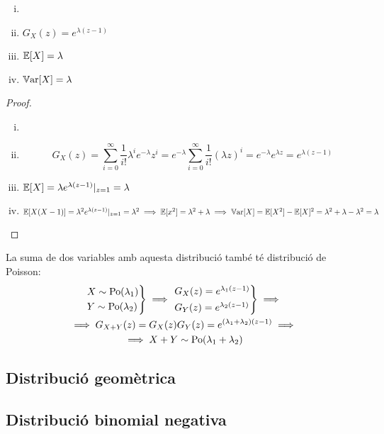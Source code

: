 \begin{prop}
    \begin{enumerate}[i)]
        \item[]
        \item $G_X(z) = e^{\lambda(z-1)}$
        \item $\operatorname{\mathbb{E}}[X] = \lambda$
        \item $\operatorname{\mathbb{V}ar}[X] = \lambda$
    \end{enumerate}
\end{prop}

\begin{proof}
    \begin{enumerate}[i)]
        \item[]
        \item \[G_X(z) = \sum_{i=0}^\infty \frac{1}{i!}\lambda^i e^{-\lambda} z^i =
            e^{-\lambda} \sum_{i=0}^\infty \frac{1}{i!}(\lambda z)^i = e^{-\lambda}e^{\lambda z} = e^{\lambda(z-1)}\]
        \item $\operatorname{\mathbb{E}}[X] = \lambda e^{\lambda(z-1)}|_{z=1} = \lambda$
        \item $\operatorname{\mathbb{E}}[X(X-1)] = \lambda^2 e^{\lambda(z-1)}|_{z=1} = \lambda^2 \implies \operatorname{\mathbb{E}}[x^2] = \lambda^2+\lambda \implies
         \operatorname{\mathbb{V}ar}[X] = \operatorname{\mathbb{E}}[X^2] - \operatorname{\mathbb{E}}[X]^2 = \lambda^2 + \lambda - \lambda^2 = \lambda$
    \end{enumerate}
\end{proof}

\begin{obs} La suma de dos variables amb aquesta distribució també té distribució de Poisson:
    \begin{gather*}
    \begin{rcases*} X \sim \operatorname{Po}(\lambda_1) \\ Y \sim \operatorname{Po}(\lambda_2) \end{rcases*} \implies
    \begin{rcases*} G_X(z) = e^{\lambda_1(z-1)} \\ G_Y(z) = e^{\lambda_2(z-1)} \end{rcases*}
    \implies \\
    \implies G_{X+Y}(z) = G_X(z)G_Y(z) = e^{(\lambda_1+\lambda_2)(z-1)} \implies \\
    \implies X+Y \sim \operatorname{Po}(\lambda_1+\lambda_2)
    \end{gather*}
\end{obs}

\subsection*{Distribució geomètrica}


\subsection*{Distribució binomial negativa}
